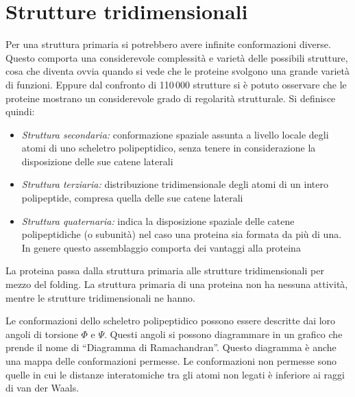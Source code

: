 

\section{Strutture tridimensionali}

Per una struttura primaria si potrebbero avere infinite conformazioni
diverse. Questo comporta una considerevole complessità e varietà delle
possibili strutture, cosa che diventa ovvia quando si vede che le
proteine svolgono una grande varietà di funzioni. Eppure dal confronto
di 110\,000 strutture si è potuto osservare che le proteine mostrano un
considerevole grado di regolarità strutturale. Si definisce quindi:

\begin{itemize}
\item
\emph{Struttura secondaria:} conformazione spaziale assunta a livello locale
degli atomi di uno scheletro polipeptidico, senza tenere in
considerazione la disposizione delle sue catene laterali
\item
\emph{Struttura terziaria:} distribuzione tridimensionale degli atomi di un
intero polipeptide, compresa quella delle sue catene laterali
\item
\emph{Struttura quaternaria:} indica la disposizione spaziale delle catene
polipeptidiche (o subunità) nel caso una proteina sia formata da più
di una. In genere questo assemblaggio comporta dei vantaggi alla
proteina
\end{itemize}


La proteina passa dalla struttura primaria alle strutture
tridimensionali per mezzo del folding. La struttura primaria di una
proteina non ha nessuna attività, mentre le strutture tridimensionali ne
hanno.


Le conformazioni dello scheletro polipeptidico possono essere descritte
dai loro angoli di torsione \(\Phi\) e \(\Psi\). Questi angoli si
possono diagrammare in un grafico che prende il nome di ``Diagramma di
Ramachandran''. Questo diagramma è anche una mappa delle conformazioni
permesse. Le conformazioni non permesse sono quelle in cui le distanze
interatomiche tra gli atomi non legati è inferiore ai raggi di van der
Waals.

